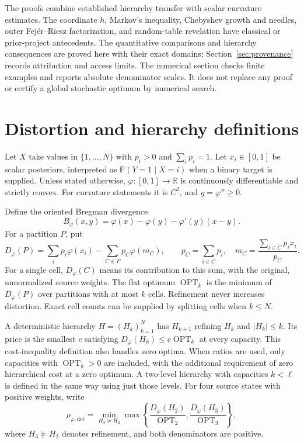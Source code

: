 \documentclass[11pt]{article}
\theoremstyle{definition}\newtheorem{definition}[theorem]{Definition}
\theoremstyle{remark}\newtheorem{remark}[theorem]{Remark}
\newcommand{\ph}{\varphi}
\newcommand{\B}{B_{\ph}}
\newcommand{\D}{D_{\ph}}
\newcommand{\OPT}{\operatorname{OPT}}
\newcommand{\R}{\mathbb R}
\newcommand{\detp}{\mathrm{det}}
\begin{document}
The proofs combine established hierarchy transfer with scalar curvature estimates. The coordinate $h$, Markov's inequality, Chebyshev growth and needles, outer Fej\'er--Riesz factorization, and random-table revelation have classical or prior-project antecedents. The quantitative comparisons and hierarchy consequences are proved here with their exact domains; Section~\ref{sec:provenance} records attribution and access limits. The numerical section checks finite examples and reports absolute denominator scales. It does not replace any proof or certify a global stochastic optimum by numerical search.

\section{Distortion and hierarchy definitions}
\label{sec:definitions}
Let $X$ take values in $\{1,\ldots,N\}$ with $p_i>0$ and $\sum_i p_i=1$. Let $x_i\in[0,1]$ be scalar posteriors, interpreted as $\mathbb P(Y=1\mid X=i)$ when a binary target is supplied. Unless stated otherwise, $\ph:[0,1]\to\R$ is continuously differentiable and strictly convex. For curvature statements it is $C^2$, and $g=\ph''\ge0$.

Define the oriented Bregman divergence
\begin{equation}
\B(x,y)=\ph(x)-\ph(y)-\ph'(y)(x-y).
\label{eq:bregman}
\end{equation}
For a partition $P$, put
\begin{equation}
\D(P)=\sum_i p_i\ph(x_i)-\sum_{C\in P}p_C\ph(m_C),\qquad
p_C=\sum_{i\in C}p_i,\quad m_C=\frac{\sum_{i\in C}p_ix_i}{p_C}.
\label{eq:distortion}
\end{equation}
For a single cell, $\D(C)$ means its contribution to this sum, with the original, unnormalized source weights. The flat optimum $\OPT_k$ is the minimum of $\D(P)$ over partitions with at most $k$ cells. Refinement never increases distortion. Exact cell counts can be supplied by splitting cells when $k\le N$.

A deterministic hierarchy $H=(H_k)_{k=1}^N$ has $H_{k+1}$ refining $H_k$ and $|H_k|\le k$. Its price is the smallest $c$ satisfying $\D(H_k)\le c\OPT_k$ at every capacity. This cost-inequality definition also handles zero optima. When ratios are used, only capacities with $\OPT_k>0$ are included, with the additional requirement of zero hierarchical cost at a zero optimum. A two-level hierarchy with capacities $k<\ell$ is defined in the same way using just those levels. For four source states with positive weights, write
\begin{equation}
\rho_{\ph,\detp}=\min_{H_3\succeq H_2}\max\left\{
\frac{\D(H_2)}{\OPT_2},\frac{\D(H_3)}{\OPT_3}\right\},
\label{eq:detprice}
\end{equation}
where $H_3\succeq H_2$ denotes refinement, and both denominators are positive.
\end{document}
